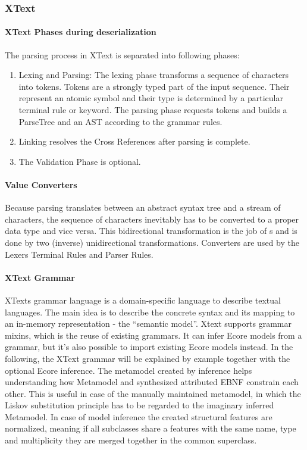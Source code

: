 \subsubsection{XText}

\paragraph{XText Phases during deserialization}
The parsing process in XText is separated into following phases:
\begin{enumerate}
	\item Lexing and Parsing: The lexing phase transforms a sequence of characters into tokens. Tokens are a strongly typed part of the input sequence. Their represent an atomic symbol and their type is determined by a particular terminal rule or keyword. The parsing phase requests tokens and builds a ParseTree and an AST according to the grammar rules.
	\item Linking resolves the Cross References after parsing is complete.
	\item The Validation Phase is optional.
\end{enumerate}

\paragraph{Value Converters}
Because parsing translates between an abstract syntax tree and a stream of characters, the sequence of characters inevitably has to be converted to a proper data type and vice versa. This bidirectional transformation is the job of s and is done by two (inverse) unidirectional transformations. Converters are used by the Lexers Terminal Rules and Parser Rules.

\paragraph{XText Grammar}
XTexts grammar language is a domain-specific language to describe textual languages. The main idea is to describe the concrete syntax and its mapping to an in-memory representation - the ``semantic model''. Xtext supports grammar mixins, which is the reuse of existing grammars. It can infer Ecore models from a grammar, but it's also possible to import existing Ecore models instead. In the following, the XText grammar will be explained by example together with the optional Ecore inference. The metamodel created by inference helps understanding how Metamodel and synthesized attributed EBNF constrain each other. This is useful in case of the manually maintained metamodel, in which the Liskov substitution principle has to be regarded to the imaginary inferred Metamodel. In case of model inference the created structural features are normalized, meaning if all subclasses share a features with the same name, type and multiplicity they are merged together in the common superclass.


